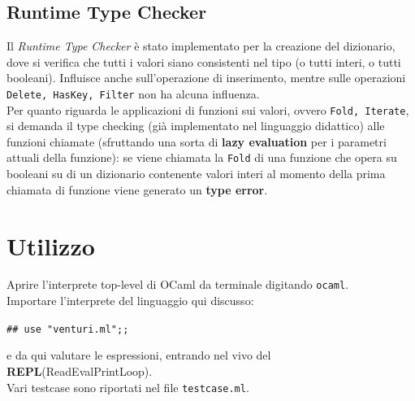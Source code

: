 \documentclass[10pt, a4paper]{article}
\begin{document}
\subsection{Runtime Type Checker}
Il \textit{Runtime Type Checker} è stato implementato per la creazione del dizionario, dove si verifica che tutti i valori siano consistenti nel tipo (o tutti interi, o tutti booleani). Influisce anche sull'operazione di inserimento, mentre sulle operazioni \texttt{Delete, HasKey, Filter} non ha alcuna influenza.\\ 
Per quanto riguarda le applicazioni di funzioni sui valori, ovvero \texttt{Fold, Iterate}, si demanda il type checking (già implementato nel linguaggio didattico) alle funzioni chiamate (sfruttando una sorta di \textbf{lazy evaluation} per i parametri attuali della funzione): se viene chiamata la \texttt{Fold} di una funzione che opera su booleani su di un dizionario contenente valori interi al momento della prima chiamata di funzione viene generato un \textbf{type error}.
\section{Utilizzo}
Aprire l'interprete top-level di OCaml da terminale digitando \texttt{ocaml}.\\ Importare l'interprete del linguaggio qui discusso:
\begin{center}
\texttt{\emph{\#}\# use "venturi.ml";;}
\end{center}
e da qui valutare le espressioni, entrando nel vivo del \textbf{REPL}(ReadEvalPrintLoop).\\Vari testcase sono riportati nel file \texttt{testcase.ml}. \clearpage
\end{document}
